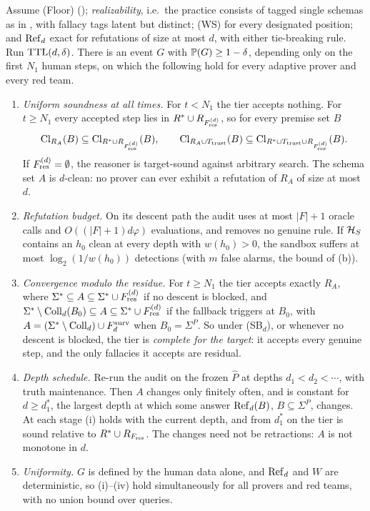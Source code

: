 \begin{theorem}\label{thm:twotier:main}
Assume (Floor) (); \emph{realizability}, i.e.\ the practice consists of tagged single schemas as in , with fallacy tags latent but distinct; (WS) for every designated position; and $\mathrm{Ref}_d$ exact for refutations of size at most $d$, with either tie-breaking rule. Run $\mathrm{TTL}(d,\delta)$. There is an event $G$ with $\mathbb{P}(G)\ge1-\delta$, depending only on the first $N_1$ human steps, on which the following hold for every adaptive prover and every red team.
\begin{enumerate}[label=(\roman*),leftmargin=*]
\item \emph{Uniform soundness at all times.} For $t<N_1$ the tier accepts nothing. For $t\ge N_1$ every accepted step lies in $R^{*}\cup R_{F^{(d)}_{\mathrm{res}}}$, so for every premise set $B$
\[
\mathrm{Cl}_{R_A}(B)\subseteq\mathrm{Cl}_{R^{*}\cup R_{F^{(d)}_{\mathrm{res}}}}(B),\qquad \mathrm{Cl}_{R_A\cup T_{\mathrm{trust}}}(B)\subseteq\mathrm{Cl}_{R^{*}\cup T_{\mathrm{trust}}\cup R_{F^{(d)}_{\mathrm{res}}}}(B).
\]
If $F^{(d)}_{\mathrm{res}}=\emptyset$, the reasoner is target-sound against arbitrary search. The schema set $A$ is $d$-clean: no prover can ever exhibit a refutation of $R_A$ of size at most $d$.
\item \emph{Refutation budget.} On its descent path the audit uses at most $|F|+1$ oracle calls and $O((|F|+1)d\varphi)$ evaluations, and removes no genuine rule. If $\mathcal{H}_S$ contains an $h_0$ clean at every depth with $w(h_0)>0$, the sandbox suffers at most $\log_2(1/w(h_0))$ detections (with $m$ false alarms, the bound of (b)).
\item \emph{Convergence modulo the residue.} For $t\ge N_1$ the tier accepts exactly $R_A$, where $\Sigma^*\subseteq A\subseteq\Sigma^*\cup F^{(d)}_{\mathrm{res}}$ if no descent is blocked, and $\Sigma^*\setminus\mathrm{Coll}_d(B_0)\subseteq A\subseteq\Sigma^*\cup F^{(d)}_{\mathrm{res}}$ if the fallback triggers at $B_0$, with $A=(\Sigma^*\setminus\mathrm{Coll}_d)\cup F^{\mathrm{surv}}_{d}$ when $B_0=\Sigma^P$. So under (SB$_d$), or whenever no descent is blocked, the tier is \emph{complete for the target}: it accepts every genuine step, and the only fallacies it accepts are residual.
\item \emph{Depth schedule.} Re-run the audit on the frozen $\hat P$ at depths $d_1<d_2<\cdots$, with truth maintenance. Then $A$ changes only finitely often, and is constant for $d\ge d_1^*$, the largest depth at which some answer $\mathrm{Ref}_d(B)$, $B\subseteq\Sigma^P$, changes. At each stage (i) holds with the current depth, and from $d_1^*$ on the tier is sound relative to $R^{*}\cup R_{F_{\mathrm{res}}}$. The changes need not be retractions: $A$ is not monotone in $d$.
\item \emph{Uniformity.} $G$ is defined by the human data alone, and $\mathrm{Ref}_d$ and $W$ are deterministic, so (i)--(iv) hold simultaneously for all provers and red teams, with no union bound over queries.
\end{enumerate}
\end{theorem}


